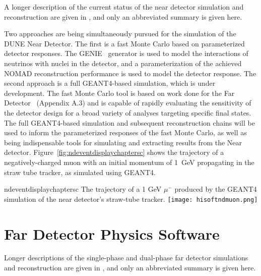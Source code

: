 A longer description of the current status of the near detector simulation and reconstruction are given
in \anxreco, and only an abbreviated summary is given here.

Two approaches are being simultaneously pursued for the simulation of
the DUNE Near Detector.  The first is a fast Monte Carlo based on
parameterized detector responses. The GENIE~\cite{GENIE} generator is
used to model the interactions of neutrinos with nuclei in the
detector, and a parameterization of the achieved NOMAD reconstruction
performance is used to model the detector response.  The second
approach is a full GEANT4-based simulation, which is under
development.  The fast Monte Carlo tool is based on work done for the
Far Detector~\cite{Adams:2013qkq} (Appendix A.3) and is capable of
rapidly evaluating the sensitivity of the detector design for a broad
variety of analyses targeting specific final states.  The full
GEANT4-based simulation and subsequent reconstruction chains will be
used to inform the parameterized responses of the fast Monte Carlo, as
well as being indispensable tools for simulating and extracting
results from the Near detector.
Figure~\ref{fig:ndeventdisplaychaptersc} shows the trajectory of a
negatively-charged muon with an initial momentum of 1~GeV propagating
in the straw tube tracker, as simulated using GEANT4.

\begin{cdrfigure}{ndeventdisplaychaptersc}
{The trajectory of a 1 GeV $\mu^-$ produced by the GEANT4 simulation of the near detector's straw-tube tracker.}
\texttt{[image: hisoftndmuon.png]}
\end{cdrfigure}

\section{Far Detector Physics Software}
\label{sec:detectors-sc-physics-software}

Longer descriptions of the single-phase and dual-phase far detector
simulations and reconstruction are given in \anxreco, and only an
abbreviated summary is given here.

%

